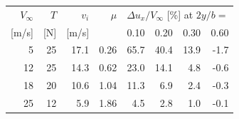 \begin{tabular}{rrrrrrrr}
  \hline
  $V_\infty$ & $T$ & $v_i$ & $\mu$ & \multicolumn{4}{c}{$\Delta u_x/V_\infty$ [\%] at $2y/b =$} \\
  {}[m/s] & [N] & [m/s] & & 0.10 & 0.20 & 0.30 & 0.60 \\
  \hline
  5 & 25 & 17.1 & 0.26 & 65.7 & 40.4 & 13.9 & -1.7 \\
  12 & 25 & 14.3 & 0.62 & 23.0 & 14.1 & 4.8 & -0.6 \\
  18 & 20 & 10.6 & 1.04 & 11.3 & 6.9 & 2.4 & -0.3 \\
  25 & 12 & 5.9 & 1.86 & 4.5 & 2.8 & 1.0 & -0.1 \\
  \hline
\end{tabular}
